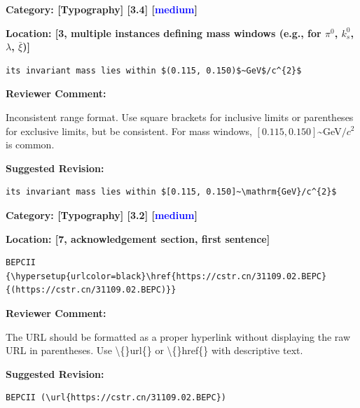 \documentclass[12pt]{article}
\begin{document}
\begin{reviewer}
\noindent \textbf{Category: [Typography] [3.4] [\textcolor{blue}{medium}]}

\noindent \textbf{Location: [3, multiple instances defining mass windows (e.g., for $\pi^0$, $k_s^0$, $\lambda$, $\bar{\xi}$)]}

\begin{lstlisting}[breaklines=true]
	its invariant mass lies within $(0.115, 0.150)$~GeV$/c^{2}$
\end{lstlisting}

\textbf{Reviewer Comment:}

Inconsistent range format. Use square brackets for inclusive limits or parentheses for exclusive limits, but be consistent. For mass windows, $[0.115, 0.150]$\textasciitilde{}GeV$/c^2$ is common.

\textbf{Suggested Revision:}

\begin{lstlisting}[breaklines=true]
	its invariant mass lies within $[0.115, 0.150]~\mathrm{GeV}/c^{2}$
\end{lstlisting}

\end{reviewer}

\begin{reviewer}
\noindent \textbf{Category: [Typography] [3.2] [\textcolor{blue}{medium}]}

\noindent \textbf{Location: [7, acknowledgement section, first sentence]}

\begin{lstlisting}[breaklines=true]
	BEPCII {\hypersetup{urlcolor=black}\href{https://cstr.cn/31109.02.BEPC}{(https://cstr.cn/31109.02.BEPC)}}
\end{lstlisting}

\textbf{Reviewer Comment:}

The URL should be formatted as a proper hyperlink without displaying the raw URL in parentheses. Use \textbackslash\{\}url\{\} or \textbackslash\{\}href\{\} with descriptive text.

\textbf{Suggested Revision:}

\begin{lstlisting}[breaklines=true]
	BEPCII (\url{https://cstr.cn/31109.02.BEPC})
\end{lstlisting}

\end{reviewer}
\end{document}
